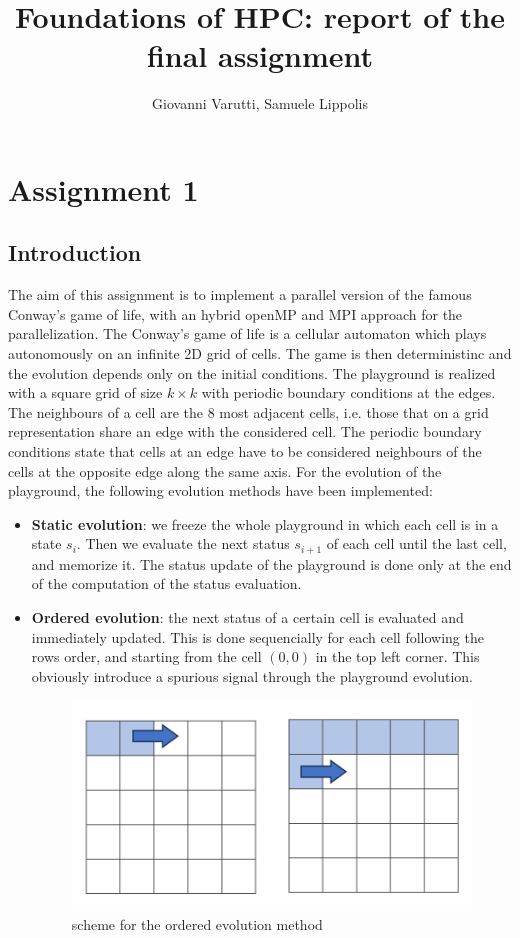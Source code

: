 \documentclass[12pt, titlepage]{report}
\title{Foundations of HPC: report of the final assignment}
\author{Giovanni Varutti, Samuele Lippolis}
\begin{document}
\maketitle
\newpage
\tableofcontents
\newpage
		
\chapter{Assignment 1}

	
\section{Introduction}\label{Introduction}

The aim of this assignment is to implement a parallel version of the famous Conway's game of life, with an hybrid openMP and MPI approach for the parallelization.
The Conway's game of life is a cellular automaton which plays autonomously on an infinite 2D grid of cells. The game is then deterministinc and the evolution 
depends only on the initial conditions. The playground is realized with a square grid of size $k\times k$ with periodic boundary conditions at the edges.
The neighbours of a cell are the 8 most adjacent cells, i.e. those that on a grid representation share an edge with the considered cell.
The periodic boundary conditions state that cells at an edge have to be considered neighbours of the cells at the opposite edge along the same axis.
For the evolution of the playground, the following evolution methods have been implemented:
\begin{itemize}
	\item \textbf{Static evolution}: we freeze the whole playground in which each cell is in a state $s_i$. Then we evaluate the next status $s_{i+1}$ of each cell until the last cell, and memorize it. The status update of the playground is done only at the end of the computation of the status evaluation.
	\item \textbf{Ordered evolution}: the next status of a certain cell is evaluated and immediately updated. This is done sequencially for each cell following the rows order, and starting from the cell $(0,0)$ in the top left corner. This obviously introduce a spurious signal through the playground evolution.
	\begin{figure}[]
		\centering
		\includegraphics[width=.9\textwidth]{Assignment-1/ordered.png}
		\caption{scheme for the ordered evolution method}
		\label{fig:ordered}
	\end{figure}
\end{itemize}
\end{document}
